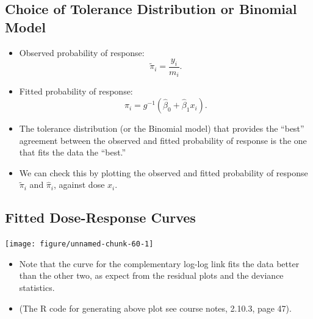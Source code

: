 \documentclass[oneside]{book}\usepackage[]{graphicx}\usepackage[svgnames]{xcolor}
\newenvironment{knitrout}{}{} %
\begin{document}
\subsection*{Choice of Tolerance Distribution or Binomial Model}
\begin{itemize}
      \item Observed probability of response:
            \[ \tilde{\pi}_i=\frac{y_i}{m_i}. \]
      \item Fitted probability of response:
            \[ \hat{\pi}_i=g^{-1}(\hat{\beta}_0+\hat{\beta}_1x_i). \]
      \item The tolerance distribution (or the Binomial model) that provides the ``best''
            agreement between the observed and fitted probability of response is the one that fits the data the ``best.''
      \item We can check this by plotting the observed and fitted probability of response $ \tilde{\pi}_i $ and $ \hat{\pi}_i $,
            against dose $ x_i $.
\end{itemize}
\subsection*{Fitted Dose-Response Curves}
\begin{knitrout}
\color{fgcolor}

{\centering \texttt{[image: figure/unnamed-chunk-60-1]} 

}


\end{knitrout}
\begin{itemize}
      \item Note that the curve for the complementary log-log link fits the data better than
            the other two, as expect from the residual plots and the deviance statistics.
      \item (The R code for generating above plot see course notes, 2.10.3, page 47).
\end{itemize}
\end{document}
